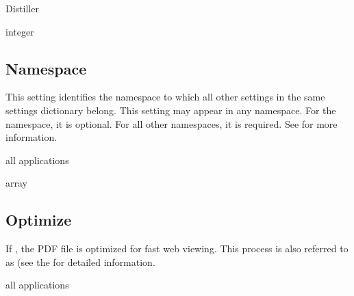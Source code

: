 \documentclass[letterpaper,12pt,english,openany,oneside]{sphinxmanual}
\begin{document}
Distiller

\label{\detokenize{PDF_Create_CommonSettings:type-11}}

integer




\subsection{Namespace}
\label{\detokenize{PDF_Create_CommonSettings:namespace}}
This setting identifies the namespace to which all other settings in the same settings dictionary belong. This setting may appear in any namespace. For the  namespace, it is optional. For all other namespaces, it is required. See  for more information.

\label{\detokenize{PDF_Create_CommonSettings:supported-by-12}}

all applications

\label{\detokenize{PDF_Create_CommonSettings:type-12}}

array

\label{\detokenize{PDF_Create_CommonSettings:default-value-10}}

\begin{sphinxVerbatim}[commandchars=\\\{\}]
\PYG{p}{[}    \PYG{p}{]}
\end{sphinxVerbatim}




\subsection{Optimize}
\label{\detokenize{PDF_Create_CommonSettings:optimize}}
If  , the PDF file is optimized for fast web viewing. This process is also referred to as  (see the  for detailed information.

\label{\detokenize{PDF_Create_CommonSettings:supported-by-13}}

all applications
\end{document}
